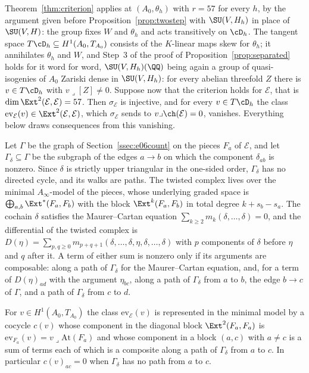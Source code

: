Theorem~\ref{thm:criterion} applies at $(A_{0},\theta_{h})$ with $r=57$ for every $h$, by the argument given before Proposition~\ref{prop:twostep} with $\SU(V,H_{h})$ in place of $\SU(V,H)$: the group fixes $W$ and $\theta_{h}$ and acts transitively on $\cD_{h}$. The tangent space $T\cD_{h}\subseteq H^{1}(A_{0},T_{A_{0}})$ consists of the $K$-linear maps skew for $\theta_{h}$; it annihilates $\theta_{h}$ and $W$, and Step~3 of the proof of Proposition~\ref{prop:separated} holds for it word for word, $\SU(V,H_{h})(\QQ)$ being again a group of quasi-isogenies of $A_{0}$ Zariski dense in $\SU(V,H_{h})$: for every abelian threefold $Z$ there is $v\in T\cD_{h}$ with $v\lrcorner[Z]\ne0$. Suppose now that the criterion holds for $\mathcal{E}$, that is $\dim\Ext^{2}(\mathcal{E},\mathcal{E})=57$. Then $\sigma_{\mathcal{E}}$ is injective, and for every $v\in T\cD_{h}$ the class $\mathrm{ev}_{\mathcal{E}}(v)\in\Ext^{2}(\mathcal{E},\mathcal{E})$, which $\sigma_{\mathcal{E}}$ sends to $v\lrcorner\ch(\mathcal{E})=0$, vanishes. Everything below draws consequences from this vanishing.

Let $\Gamma$ be the graph of Section~\ref{ssec:e06count} on the pieces $F_{a}$ of $\mathcal{E}$, and let $\Gamma_{\delta}\subseteq\Gamma$ be the subgraph of the edges $a\to b$ on which the component $\delta_{ab}$ is nonzero. Since $\delta$ is strictly upper triangular in the one-sided order, $\Gamma_{\delta}$ has no directed cycle, and its walks are paths. The twisted complex lives over the minimal $A_{\infty}$-model of the pieces, whose underlying graded space is $\bigoplus_{a,b}\Ext^{*}(F_{a},F_{b})$ with the block $\Ext^{k}(F_{a},F_{b})$ in total degree $k+s_{b}-s_{a}$. The cochain $\delta$ satisfies the Maurer--Cartan equation $\sum_{k\ge2}m_{k}(\delta,\dots,\delta)=0$, and the differential of the twisted complex is $D(\eta)=\sum_{p,q\ge0}m_{p+q+1}(\delta,\dots,\delta,\eta,\delta,\dots,\delta)$ with $p$ components of $\delta$ before $\eta$ and $q$ after it. A term of either sum is nonzero only if its arguments are composable: along a path of $\Gamma_{\delta}$ for the Maurer--Cartan equation, and, for a term of $D(\eta)_{ad}$ with the argument $\eta_{bc}$, along a path of $\Gamma_{\delta}$ from $a$ to $b$, the edge $b\to c$ of $\Gamma$, and a path of $\Gamma_{\delta}$ from $c$ to $d$.

\begin{lemma}\label{lem:cocycle}
For $v\in H^{1}(A_{0},T_{A_{0}})$ the class $\mathrm{ev}_{\mathcal{E}}(v)$ is represented in the minimal model by a cocycle $c(v)$ whose component in the diagonal block $\Ext^{2}(F_{a},F_{a})$ is $\mathrm{ev}_{F_{a}}(v)=v\lrcorner\mathrm{At}(F_{a})$ and whose component in a block $(a,c)$ with $a\ne c$ is a sum of terms each of which is a composite along a path of $\Gamma_{\delta}$ from $a$ to $c$. In particular $c(v)_{ac}=0$ when $\Gamma_{\delta}$ has no path from $a$ to $c$.
\end{lemma}

